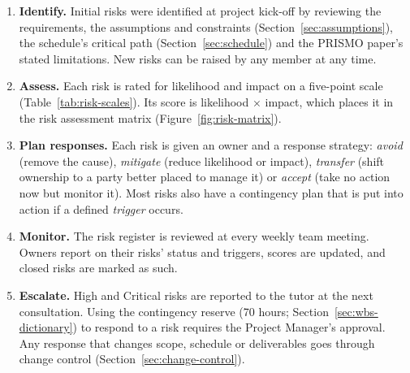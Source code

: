 \begin{enumerate}[nosep]
  \item \textbf{Identify.} Initial risks were identified at project kick-off by reviewing the requirements, the assumptions and constraints (Section~\ref{sec:assumptions}), the schedule's critical path (Section~\ref{sec:schedule}) and the PRISMO paper's stated limitations. New risks can be raised by any member at any time.
  \item \textbf{Assess.} Each risk is rated for likelihood and impact on a five-point scale (Table~\ref{tab:risk-scales}). Its score is likelihood $\times$ impact, which places it in the risk assessment matrix (Figure~\ref{fig:risk-matrix}).
  \item \textbf{Plan responses.} Each risk is given an owner and a response strategy: \emph{avoid} (remove the cause), \emph{mitigate} (reduce likelihood or impact), \emph{transfer} (shift ownership to a party better placed to manage it) or \emph{accept} (take no action now but monitor it). Most risks also have a contingency plan that is put into action if a defined \emph{trigger} occurs.
  \item \textbf{Monitor.} The risk register is reviewed at every weekly team meeting. Owners report on their risks' status and triggers, scores are updated, and closed risks are marked as such.
  \item \textbf{Escalate.} High and Critical risks are reported to the tutor at the next consultation. Using the contingency reserve (70 hours; Section~\ref{sec:wbs-dictionary}) to respond to a risk requires the Project Manager's approval. Any response that changes scope, schedule or deliverables goes through change control (Section~\ref{sec:change-control}).
\end{enumerate}


